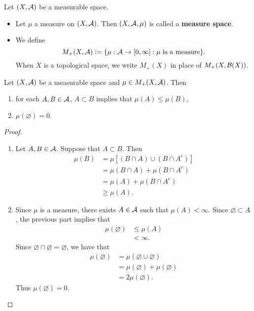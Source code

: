 \documentclass{book}
\begin{document}
	\begin{defn} 
		Let $(X,\mathcal{A})$ be a measurable space. 
		\begin{itemize}
			\item Let $\mu$ a measure on $(X, \mathcal{A})$. Then $(X, \mathcal{A}, \mu)$ is called a \textbf{measure space}. 
			\item We define 
			$$M_+(X, \mathcal{A}) \vcentcolon= \{\mu: \mathcal{A} \rightarrow [0,\infty]: \mu \text{ is a measure}\}.$$ 
			When $X$ is a topological space, we write $M_+(X)$ in place of $M_+(X, \mathcal{B}(X))$.
		\end{itemize}
	\end{defn}

	\begin{ex} 
		Let $(X,\mathcal{A})$ be a measurable space and $\mu \in M_+(X, \mathcal{A})$. Then 
		\begin{enumerate}
			\item for each $A, B \in \mathcal{A}$, $A \subset B$ implies that $\mu(A) \leq \mu(B)$,
			\item $\mu(\varnothing) = 0$.
		\end{enumerate}
	\end{ex}
	
	\begin{proof}\
		\begin{enumerate}
			\item Let $A, B \in \mathcal{A}$. Suppose that $A \subset B$. Then
			\begin{align*}
				\mu(B)
				& = \mu[(B \cap A) \cup (B \cap A^c)] \\
				& = \mu(B \cap A) + \mu(B \cap A^c) \\
				& = \mu(A) + \mu(B \cap A^c) \\ 
				& \geq \mu(A).
			\end{align*}
			\item Since $\mu$ is a measure, there exists $A \in \mathcal{A}$ such that $\mu(A)< \infty$. Since $\varnothing \subset A$, the previous part implies that 
			\begin{align*}
				\mu(\varnothing)
				& \leq \mu(A) \\
				& < \infty. 
			\end{align*}
			Since $\varnothing \cap \varnothing = \varnothing$, we have that
			\begin{align*}
				\mu(\varnothing) 
				& = \mu(\varnothing \cup \varnothing) \\
				& = \mu(\varnothing) + \mu(\varnothing) \\
				& = 2 \mu(\varnothing). 
			\end{align*}
			Thus $\mu(\varnothing) = 0$.
		\end{enumerate}
	\end{proof}
	
\end{document}
